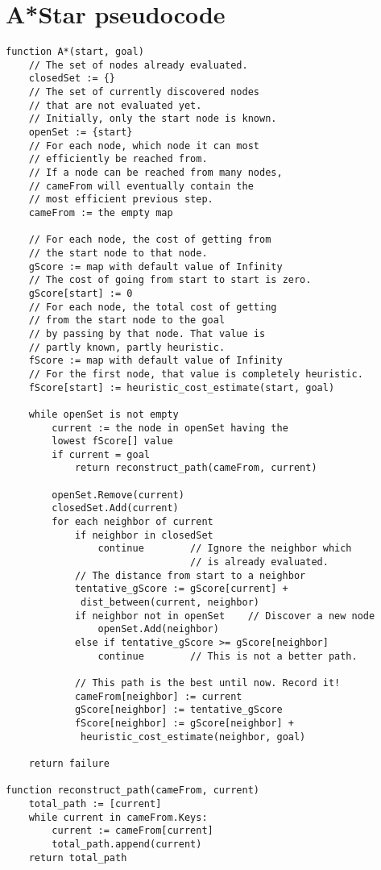 \documentclass{kththesis}
\begin{document}
 
\printbibliography[heading=bibintoc] %
\clearpage 
\appendix
\section{A*Star pseudocode}
\begin{verbatim}
function A*(start, goal)
    // The set of nodes already evaluated.
    closedSet := {}
    // The set of currently discovered nodes
    // that are not evaluated yet.
    // Initially, only the start node is known.
    openSet := {start}
    // For each node, which node it can most 
    // efficiently be reached from.
    // If a node can be reached from many nodes, 
    // cameFrom will eventually contain the
    // most efficient previous step.
    cameFrom := the empty map

    // For each node, the cost of getting from 
    // the start node to that node.
    gScore := map with default value of Infinity
    // The cost of going from start to start is zero.
    gScore[start] := 0 
    // For each node, the total cost of getting 
    // from the start node to the goal
    // by passing by that node. That value is 
    // partly known, partly heuristic.
    fScore := map with default value of Infinity
    // For the first node, that value is completely heuristic.
    fScore[start] := heuristic_cost_estimate(start, goal)

    while openSet is not empty
        current := the node in openSet having the 
        lowest fScore[] value
        if current = goal
            return reconstruct_path(cameFrom, current)

        openSet.Remove(current)
        closedSet.Add(current)
        for each neighbor of current
            if neighbor in closedSet
                continue        // Ignore the neighbor which
                                // is already evaluated.
            // The distance from start to a neighbor
            tentative_gScore := gScore[current] +
             dist_between(current, neighbor)
            if neighbor not in openSet    // Discover a new node
                openSet.Add(neighbor)
            else if tentative_gScore >= gScore[neighbor]
                continue        // This is not a better path.

            // This path is the best until now. Record it!
            cameFrom[neighbor] := current
            gScore[neighbor] := tentative_gScore
            fScore[neighbor] := gScore[neighbor] +
             heuristic_cost_estimate(neighbor, goal)

    return failure

function reconstruct_path(cameFrom, current)
    total_path := [current]
    while current in cameFrom.Keys:
        current := cameFrom[current]
        total_path.append(current)
    return total_path
\end{verbatim}
 
 
\end{document}
